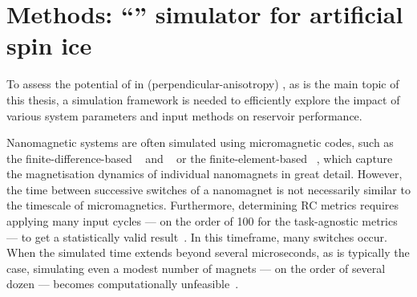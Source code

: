 \chapter{Methods: ``\hotspice'' simulator for artificial spin ice}\label{ch:Hotspice}

To assess the potential of  in (perpendicular-anisotropy) , as is the main topic of this thesis, a simulation framework is needed to efficiently explore the impact of various system parameters and input methods on reservoir performance. \par
Nanomagnetic systems are often simulated using micromagnetic codes, such as the finite-difference-based \mumax~\cite{mumax3} and \oommf~\cite{OOMMF} or the finite-element-based \nmag~\cite{Nmag}, which capture the magnetisation dynamics of individual nanomagnets in great detail.
However, the time between successive switches of a nanomagnet is not necessarily similar to the timescale of micromagnetics.
Furthermore, determining RC metrics requires applying many input cycles --- on the order of 100 for the task-agnostic metrics --- to get a statistically valid result~\cite{RC_TaskAgnosticMetrics_v2}.
In this timeframe, many switches occur.
When the simulated time extends beyond several microseconds, as is typically the case, simulating even a modest number of magnets --- on the order of several dozen --- becomes computationally unfeasible~\cite{leo2021chiral}. \\\par

